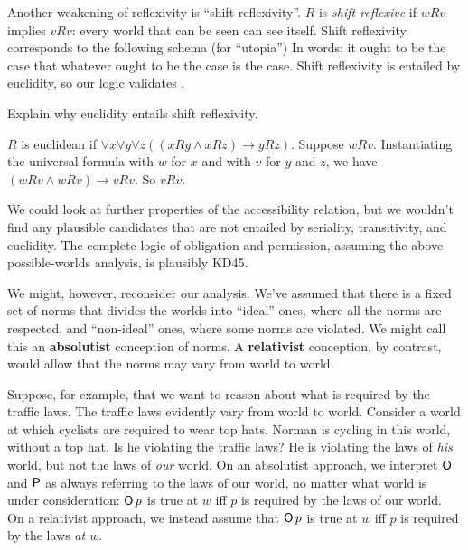 Another weakening of reflexivity is ``shift reflexivity''. $R$ is \emph{shift
  reflexive} if $wRv$ implies $vRv$: every world that can be seen can see
itself. Shift reflexivity corresponds to the following schema  (for
``utopia'')
%
%
In words: it ought to be the case that whatever ought to be the case is the
case. Shift reflexivity is entailed by euclidity, so our logic validates .

\begin{exercise}\label{ex:shiftref}
  Explain why euclidity entails shift reflexivity.
\end{exercise}
\begin{solution}
  $R$ is euclidean if $\forall x \forall y \forall z((xRy \land xRz) \to yRz)$.
  Suppose $wRv$. Instantiating the universal formula with $w$ for $x$ and with
  $v$ for $y$ and $z$, we have $(wRv \land wRv) \to vRv$. So $vRv$.
\end{solution}

We could look at further properties of the accessibility relation, but we
wouldn't find any plausible candidates that are not entailed by seriality,
transitivity, and euclidity. The complete logic of obligation and permission,
assuming the above possible-worlds analysis, is plausibly KD45.

We might, however, reconsider our analysis. We've assumed that there is a fixed
set of norms that divides the worlds into ``ideal'' ones, where all the norms
are respected, and ``non-ideal'' ones, where some norms are violated. We might
call this an \textbf{absolutist} conception of norms. A \textbf{relativist}
conception, by contrast, would allow that the norms may vary from world to
world.

Suppose, for example, that we want to reason about what is required by the
traffic laws. The traffic laws evidently vary from world to world. Consider a
world at which cyclists are required to wear top hats. Norman is cycling in this
world, without a top hat. Is he violating the traffic laws? He is violating the
laws of \emph{his} world, but not the laws of \emph{our} world. On an absolutist
approach, we interpret $\operatorname{\mathsf{O}}$ and $\operatorname{\mathsf{P}}$ as always referring to the laws of our
world, no matter what world is under consideration: $\operatorname{\mathsf{O}} p$ is true at $w$ iff
$p$ is required by the laws of our world. On a relativist approach, we instead
assume that $\operatorname{\mathsf{O}} p$ is true at $w$ iff $p$ is required by the laws \emph{at $w$}.

